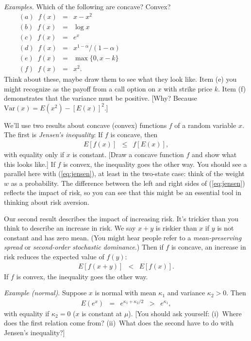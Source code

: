 \documentclass[11pt]{article}
\begin{document}
{\it Examples.\/}
Which of the following are concave?  Convex?
\begin{eqnarray*}
    (a) \;\; f(x) &=& x - x^2 \\
    (b) \;\; f(x) &=& \log x  \\
    (c) \;\; f(x) &=& e^x \\
    (d) \;\; f(x) &=& x^{1-\alpha}/(1-\alpha) \\
    (e) \;\; f(x) &=& \max \{ 0, x-k \}  \\
    (f) \;\; f(x) &=& x^2.
    \phantom{xxxxxxxxxxxxxxxxxxxxxxxxxxxxxxxxxxxxxxx}
\end{eqnarray*}
Think about these, maybe draw them to see what they look like.
Item (e) you might recognize as the payoff from
a call option on $x$ with strike price $k$.
Item (f) demonstrates that the variance must be positive.
[Why?  Because $\mbox{Var}(x) = E(x^2) - [E(x)]^2$.]


We'll use two results about concave (convex) functions $f$
of a random variable $x$.
The first is {\it Jensen's inequality\/}:
If $f$ is concave, then
\begin{eqnarray}
    E [f(x)] &\leq& f [E(x)] ,
    \label{eq:jensen}
\end{eqnarray}
with equality only if $x$ is constant.
[Draw a concave function $f$ and show what this looks like.]
If $f$ is convex, the inequality goes the other way.
You should see a parallel here with (\ref{eq:jensen}), at least in the two-state case:
think of the weight $w$ as a probability.
The difference between the left and right sides of (\ref{eq:jensen}) reflects
the impact of risk, so you can see that this might be
an essential tool in thinking about risk aversion.

Our second result describes the impact of increasing risk.
It's trickier than you think to describe an increase in risk.
We say $ x+y$ is riskier than $x$ if $y$ is not constant and has zero mean.
(You might hear people refer to a {\it mean-preserving spread\/} or
{\it second-order stochastic dominance\/}.) 
Then if $f$ is concave, an increase in risk reduces the expected value of $f(y)$: 
\begin{eqnarray*}
    E[ f(x + y)] &<& E[f(x)] .
\end{eqnarray*}
If $f$ is convex, the inequality goes the other way.

{\it Example (normal)\/}.
Suppose $x$ is normal with mean $\kappa_1$ and variance $\kappa_2>0$.
Then
\begin{eqnarray*}
    E \left( e^x \right) &=&  e^{\kappa_1 + \kappa_2/2}
            \;\;>\;\; e^{\kappa_1},
\end{eqnarray*}
with equality if $\kappa_2 = 0$ ($x$ is constant at $\mu$).
[You should ask yourself:
(i)~Where does the first relation come from?
(ii)~What does the second have to do with Jensen's inequality?]
\end{document}

